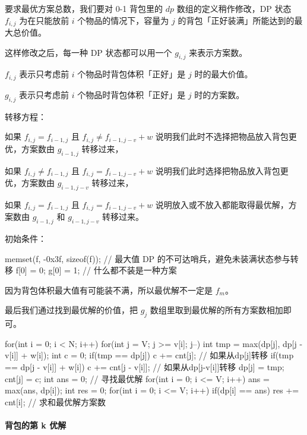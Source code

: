 要求最优方案总数，我们要对 0-1 背包里的 \(\mathit{dp}\) 数组的定义稍作修改，DP 状态 \(f_{i,j}\) 为在只能放前 \(i\) 个物品的情况下，容量为 \(j\) 的背包「正好装满」所能达到的最大总价值。

这样修改之后，每一种 DP 状态都可以用一个 \(g_{i,j}\) 来表示方案数。

\(f_{i,j}\) 表示只考虑前 \(i\) 个物品时背包体积「正好」是 \(j\) 时的最大价值。

\(g_{i,j}\) 表示只考虑前 \(i\) 个物品时背包体积「正好」是 \(j\) 时的方案数。

转移方程：

如果 \(f_{i,j} = f_{i-1,j}\) 且 \(f_{i,j} \neq f_{i-1,j-v}+w\) 说明我们此时不选择把物品放入背包更优，方案数由 \(g_{i-1,j}\) 转移过来，

如果 \(f_{i,j} \neq f_{i-1,j}\) 且 \(f_{i,j} = f_{i-1,j-v}+w\) 说明我们此时选择把物品放入背包更优，方案数由 \(g_{i-1,j-v}\) 转移过来，

如果 \(f_{i,j} = f_{i-1,j}\) 且 \(f_{i,j} = f_{i-1,j-v}+w\) 说明放入或不放入都能取得最优解，方案数由 \(g_{i-1,j}\) 和 \(g_{i-1,j-v}\) 转移过来。

初始条件：


\begin{codeline}
memset(f, -0x3f, sizeof(f)); // 最大值 DP 的不可达哨兵，避免未装满状态参与转移
f[0] = 0;
g[0] = 1; // 什么都不装是一种方案
\end{codeline}


因为背包体积最大值有可能装不满，所以最优解不一定是 \(f_{m}\)。

最后我们通过找到最优解的价值，把 \(g_{j}\) 数组里取到最优解的所有方案数相加即可。


\begin{codeline}
for(int i = 0; i < N; i++) {
    for(int j = V; j >= v[i]; j--) {
        int tmp = max(dp[j], dp[j - v[i]] + w[i]);
        int c = 0;
        if(tmp == dp[j]) {
            c += cnt[j]; // 如果从dp[j]转移
        }
        if(tmp == dp[j - v[i]] + w[i]) {
            c += cnt[j - v[i]]; // 如果从dp[j-v[i]]转移
        }
        dp[j] = tmp;
        cnt[j] = c;
    }
}
int ans = 0; // 寻找最优解
for(int i = 0; i <= V; i++) {
    ans = max(ans, dp[i]);
}
int res = 0;
for(int i = 0; i <= V; i++) {
    if(dp[i] == ans) {
        res += cnt[i]; // 求和最优解方案数
    }
}
\end{codeline}


\paragraph{背包的第 k 优解}\label{ux80ccux5305ux7684ux7b2c-k-ux4f18ux89e3}

